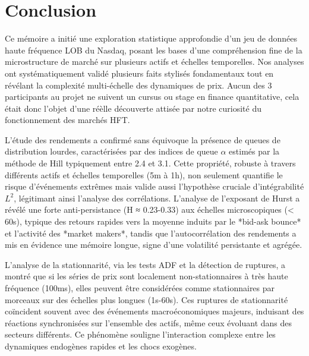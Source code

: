 \documentclass[10pt,a4paper]{article}
\theoremstyle{definition}
\theoremstyle{remark}
\begin{document}
\newpage
\section*{Conclusion}
    Ce mémoire a initié une exploration statistique approfondie d'un jeu de données haute fréquence LOB du Nasdaq, posant les bases d'une compréhension fine de la microstructure de marché sur plusieurs actifs et échelles temporelles. Nos analyses ont systématiquement validé plusieurs faits stylisés fondamentaux tout en révélant la complexité multi-échelle des dynamiques de prix. Aucun des 3 participants au projet ne suivent un cursus ou stage en finance quantitative, cela était donc l'objet d'une réèlle découverte attisée par notre curiosité du fonctionnement des marchés HFT.

    \vspace{0.5cm}

    L'étude des rendements a confirmé sans équivoque la présence de queues de distribution lourdes, caractérisées par des indices de queue $\alpha$ estimés par la méthode de Hill typiquement entre 2.4 et 3.1. Cette propriété, robuste à travers différents actifs et échelles temporelles (5m à 1h), non seulement quantifie le risque d'événements extrêmes mais valide aussi l'hypothèse cruciale d'intégrabilité $L^2$, légitimant ainsi l'analyse des corrélations. L'analyse de l'exposant de Hurst a révélé une forte anti-persistance (H ≈ 0.23-0.33) aux échelles microscopiques (< 60s), typique des retours rapides vers la moyenne induits par le *bid-ask bounce* et l'activité des *market makers*, tandis que l'autocorrélation des rendements a mis en évidence une mémoire longue, signe d'une volatilité persistante et agrégée.

    \vspace{0.5cm}

    L'analyse de la stationnarité, via les tests ADF et la détection de ruptures, a montré que si les séries de prix sont localement non-stationnaires à très haute fréquence (100ms), elles peuvent être considérées comme stationnaires par morceaux sur des échelles plus longues (1s-60s). Ces ruptures de stationnarité coïncident souvent avec des événements macroéconomiques majeurs, induisant des réactions synchronisées sur l'ensemble des actifs, même ceux évoluant dans des secteurs différents. Ce phénomène souligne l'interaction complexe entre les dynamiques endogènes rapides et les chocs exogènes.

    \vspace{0.5cm}
\end{document}
